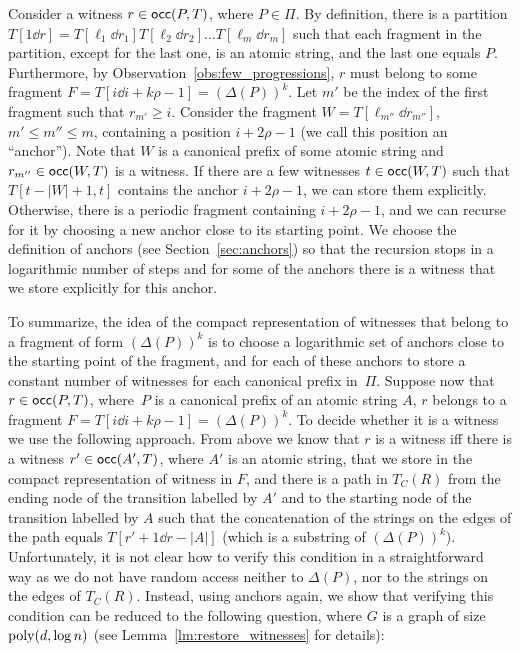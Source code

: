 Consider a witness $r \in \mathsf{occ}(P, T)$, where $P \in \Pi$. By definition, there is a partition $T[1\dd r] = T[\ell_1\dd r_1] T[\ell_2 \dd r_2] \ldots T[\ell_m \dd r_m]$ such that each fragment in the partition, except for the last one, is an atomic string, and the last one equals $P$. Furthermore, by Observation~\ref{obs:few_progressions}, $r$ must belong to some fragment $F = T[i \dd i + k \rho -1] = (\Delta(P))^k$. Let $m'$ be the index of the first fragment such that $r_{m'} \ge i$. Consider the fragment $W = T[\ell_{m''} \dd r_{m''}]$, $m' \le m'' \le m$, containing a position $i+2\rho-1$ (we call this position an ``anchor''). Note that $W$  is a canonical prefix of some atomic string and $r_{m''} \in \mathsf{occ}(W, T)$ is a witness. If there are a few witnesses $t \in \mathsf{occ}(W, T)$ such that $T[t-|W|+1,t]$ contains the anchor $i+2\rho-1$, we can store them explicitly. Otherwise, there is a periodic fragment containing $i+2\rho-1$, and we can recurse for it by choosing a new anchor close to its starting point. We choose the definition of anchors (see Section~\ref{sec:anchors}) so that the recursion stops in a logarithmic number of steps and for some of the anchors there is a witness that we store explicitly for this anchor. 

To summarize, the idea of the compact representation of witnesses that belong to a fragment of form $(\Delta(P))^k$ is to choose a logarithmic set of anchors close to the starting point of the fragment, and for each of these anchors to store a constant number of witnesses for each canonical prefix in~$\Pi$.  Suppose now that $r \in \mathsf{occ}(P,T)$, where~$P$ is a canonical prefix of an atomic string $A$, $r$ belongs to a fragment $F = T[i \dd i + k \rho -1] = (\Delta(P))^k$. To decide whether it is a witness we use the following approach. From above we know that $r$ is a witness iff there is a witness $r' \in \mathsf{occ}(A',T)$, where $A'$ is an atomic string, that we store in the compact representation of witness in $F$, and there is a path in $T_C(R)$ from the ending node of the transition labelled by $A'$ and to the starting node of the transition labelled by $A$ such that the concatenation of the strings on the edges of the path equals $T[r'+1\dd r-|A|]$ (which is a substring of $(\Delta(P))^k$). Unfortunately, it is not clear how to verify this condition in a straightforward way as we do not have random access neither to $\Delta(P)$, nor to the strings on the edges of $T_C(R)$. Instead, using anchors again, we show that verifying this condition can be reduced to the following question, where $G$ is a graph of size $\mathrm{poly}(d, \log n)$ (see Lemma~\ref{lm:restore_witnesses} for details):

